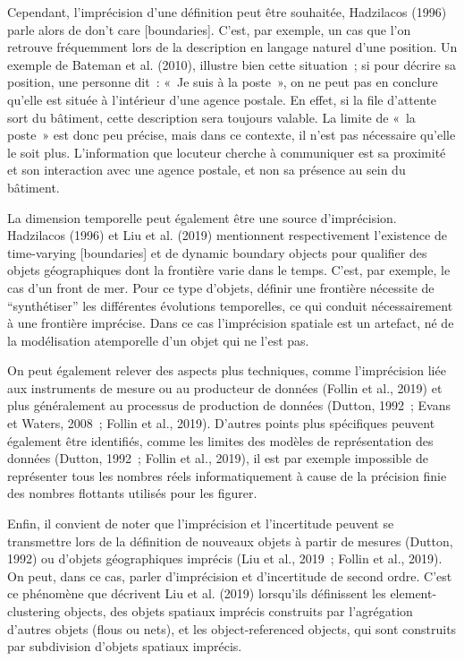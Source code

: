 Cependant, l’imprécision d’une définition peut être souhaitée,
Hadzilacos (1996) parle alors de don't care [boundaries]. C’est, par
exemple, un cas que l’on retrouve fréquemment lors de la description
en langage naturel d’une position. Un exemple de Bateman et
al. (2010), illustre bien cette situation ; si pour décrire sa
position, une personne dit : « Je suis à la poste », on ne peut pas en
conclure qu’elle est située à l’intérieur d’une agence postale. En
effet, si la file d’attente sort du bâtiment, cette description sera
toujours valable. La limite de « la poste » est donc peu précise, mais
dans ce contexte, il n’est pas nécessaire qu’elle le soit
plus. L’information que locuteur cherche à communiquer est sa
proximité et son interaction avec une agence postale, et non sa
présence au sein du bâtiment.

La dimension temporelle peut également être une source
d’imprécision. Hadzilacos (1996) et Liu et al. (2019) mentionnent
respectivement l’existence de time-varying [boundaries] et de dynamic
boundary objects pour qualifier des objets géographiques dont la
frontière varie dans le temps. C’est, par exemple, le cas d’un front
de mer. Pour ce type d’objets, définir une frontière nécessite de
“synthétiser” les différentes évolutions temporelles, ce qui conduit
nécessairement à une frontière imprécise. Dans ce cas l’imprécision
spatiale est un artefact, né de la modélisation atemporelle d’un objet
qui ne l’est pas.

On peut également relever des aspects plus techniques, comme
l’imprécision liée aux instruments de mesure ou au producteur de
données (Follin et al., 2019) et plus généralement au processus de
production de données (Dutton, 1992 ; Evans et Waters, 2008 ; Follin
et al., 2019). D’autres points plus spécifiques peuvent également être
identifiés, comme les limites des modèles de représentation des
données (Dutton, 1992 ; Follin et al., 2019), il est par exemple
impossible de représenter tous les nombres réels informatiquement à
cause de la précision finie des nombres flottants utilisés pour les
figurer.

Enfin, il convient de noter que l’imprécision et l’incertitude peuvent
se transmettre lors de la définition de nouveaux objets à partir de
mesures (Dutton, 1992) ou d’objets géographiques imprécis (Liu et al.,
2019 ; Follin et al., 2019). On peut, dans ce cas, parler
d’imprécision et d’incertitude de second ordre. C’est ce phénomène que
décrivent Liu et al. (2019) lorsqu’ils définissent les
element-clustering objects, des objets spatiaux imprécis construits
par l’agrégation d’autres objets (flous ou nets), et les
object-referenced objects, qui sont construits par subdivision
d’objets spatiaux imprécis.









